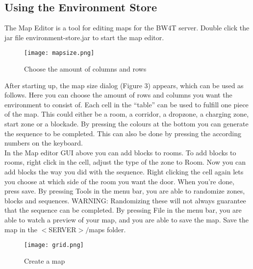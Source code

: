 \documentclass[11pt,a4paper]{article}
\begin{document}
\subsection{Using the Environment Store}
The Map Editor is a tool for editing maps for the BW4T server. Double click the jar file environment-store.jar to start the map editor.
\begin{wrapfigure}{r}{0.5\textwidth}
  \begin{center}
    \texttt{[image: mapsize.png]}
  \end{center}
  \caption{Choose the amount of columns and rows}
\end{wrapfigure}
After starting up, the map size dialog (Figure 3) appears, which can be used as follows.
Here you can choose the amount of rows and columns you want the environment to consist of. Each cell in the “table” can be used to fulfill one piece of the map. This could either be a room, a corridor, a dropzone, a charging zone, start zone or a blockade. By pressing the colours at the bottom you can generate the sequence to be completed. This can also be done by pressing the according numbers on the keyboard. \\
In the Map editor GUI above you can add blocks to rooms. To add blocks to rooms, right click in the cell, adjust the type of the zone to Room. Now you can add blocks the way you did with the sequence. Right clicking the cell again lets you choose at which side of the room you want the door. When you're done, press save. 
By pressing Tools in the menu bar, you are able to randomize zones, blocks and sequences. WARNING: Randomizing these will not always guarantee that the sequence can be completed.
By pressing File in the menu bar, you are able to watch a preview of your map, and you are able to save the map. Save the map in the $<$SERVER$>/$maps folder.
\begin{figure}
    \texttt{[image: grid.png]}
    \caption{Create a map}
\end{figure}

\newpage
\end{document}
